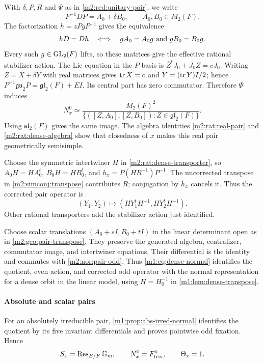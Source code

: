 With $\delta,P,R$ and $\Psi$ as in \cref{m2:red:unitary-pair}, we write
\begin{equation}\label{m2:nor:pair-coordinate}
 P^{-1}DP=A_0+\delta B_0,\qquad A_0,B_0\in M_2(F).
\end{equation}
The factorization $h=zPgP^{-1}$ gives the equivalence
\[
 hD=Dh\quad\Longleftrightarrow\quad
 gA_0=A_0g\ \hbox{and}\ gB_0=B_0g.
\]
Every such $g\in\operatorname{GL}_2(F)$ lifts, so these matrices give the
effective rational stabilizer action.
The Lie equation in the $P$ basis is
$\bar Z^tJ_0+J_0Z=cJ_0$. Writing $Z=X+\delta Y$ with real matrices
gives $\operatorname{tr} X=c$ and $Y=(\operatorname{tr} Y)I/2$; hence
$P^{-1}\mathfrak{gu}_2P=\mathfrak{gl}_2(F)+EI$.
Its central part has zero commutator. Therefore $\Psi$ induces
\begin{equation}\label{m2:nor:pair-normal}
 N_x^0\simeq
 \frac{M_2(F)^2}
 {\{([Z,A_0],[Z,B_0]):Z\in\mathfrak{gl}_2(F)\}}.
\end{equation}
Using $\mathfrak{sl}_2(F)$ gives the same image. The algebra identities
\cref{m2:rat:real-pair} and \eqref{m2:rat:dense-algebra} show that closedness
of $x$ makes this real pair geometrically semisimple.

Choose the symmetric intertwiner $H$ in
\cref{m2:rat:dense-transporter}, so $A_0H=HA_0^t$, $B_0H=HB_0^t$,
and $h_x=P(HR^{-1})P^{-1}$. The uncorrected transpose in
\eqref{m2:simconj:transpose} contributes $R$; conjugation by $h_x$
cancels it. Thus the corrected pair operator is
\begin{equation}\label{m2:nor:pair-odd}
 (Y_1,Y_2)\longmapsto(HY_1^tH^{-1},HY_2^tH^{-1}).
\end{equation}
Other rational transporters add the stabilizer action just identified.

Choose scalar translations $(A_0+sI,B_0+tI)$ in the linear
determinant open as in \cref{m2:geo:pair-transpose}. They preserve the
generated algebra, centralizer, commutator image, and intertwiner
equations. Their differential is the identity and commutes with
\eqref{m2:nor:pair-odd}. Thus \cref{m1:eq:dense-normal} identifies the
quotient, even action, and corrected odd operator with the normal
representation for a dense orbit in the linear model, using $H=H_0^{-1}$ in \cref{m1:lem:dense-transpose}.

\paragraph{Absolute and scalar pairs}

For an absolutely irreducible pair, \cref{m1:prop:abs-irred-normal}
identifies the quotient by its five invariant differentials and
proves pointwise odd fixation. Hence
\begin{equation}\label{m2:nor:dense-simple}
 S_x=\operatorname{Res}_{E/F}\mathbb G_m,\qquad N_x^0=F^5_{\mathrm{triv}},\qquad\Theta_x=1.
\end{equation}

